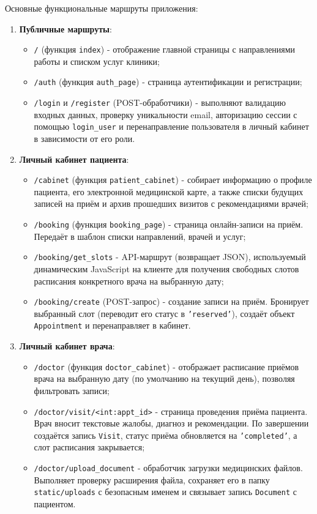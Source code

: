 Основные функциональные маршруты приложения:
\begin{enumerate}
    \item \textbf{Публичные маршруты}:
    \begin{itemize}
        \item \texttt{/} (функция \texttt{index}) - отображение главной страницы с направлениями работы и списком услуг клиники;
        \item \texttt{/auth} (функция \texttt{auth\_page}) - страница аутентификации и регистрации;
        \item \texttt{/login} и \texttt{/register} (POST-обработчики) - выполняют валидацию входных данных, проверку уникальности email, авторизацию сессии с помощью \texttt{login\_user} и перенаправление пользователя в личный кабинет в зависимости от его роли.
    \end{itemize}

    \item \textbf{Личный кабинет пациента}:
    \begin{itemize}
        \item \texttt{/cabinet} (функция \texttt{patient\_cabinet}) - собирает информацию о профиле пациента, его электронной медицинской карте, а также списки будущих записей на приём и архив прошедших визитов с рекомендациями врачей;
        \item \texttt{/booking} (функция \texttt{booking\_page}) - страница онлайн-записи на приём. Передаёт в шаблон списки направлений, врачей и услуг;
        \item \texttt{/booking/get\_slots} - API-маршрут (возвращает JSON), используемый динамическим JavaScript на клиенте для получения свободных слотов расписания конкретного врача на выбранную дату;
        \item \texttt{/booking/create} (POST-запрос) - создание записи на приём. Бронирует выбранный слот (переводит его статус в \texttt{'reserved'}), создаёт объект \texttt{Appointment} и перенаправляет в кабинет.
    \end{itemize}

    \item \textbf{Личный кабинет врача}:
    \begin{itemize}
        \item \texttt{/doctor} (функция \texttt{doctor\_cabinet}) - отображает расписание приёмов врача на выбранную дату (по умолчанию на текущий день), позволяя фильтровать записи;
        \item \texttt{/doctor/visit/<int:appt\_id>} - страница проведения приёма пациента. Врач вносит текстовые жалобы, диагноз и рекомендации. По завершении создаётся запись \texttt{Visit}, статус приёма обновляется на \texttt{'completed'}, а слот расписания закрывается;
        \item \texttt{/doctor/upload\_document} - обработчик загрузки медицинских файлов. Выполняет проверку расширения файла, сохраняет его в папку \texttt{static/uploads} с безопасным именем и связывает запись \texttt{Document} с пациентом.
    \end{itemize}


\end{enumerate}
